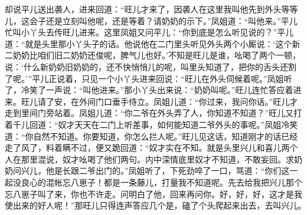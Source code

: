 \documentclass[12pt,oneside]{book}
\begin{document}
却说平儿送出袭人，进来回道：“旺儿才来了，因袭人在这里我叫他先到外头等等儿，这会子还是立刻叫他呢，还是等着？请奶奶的示下。”凤姐道：“叫他来。”平儿忙叫小丫头去传旺儿进来。这里凤姐又问平儿：“你到底是怎么听见说的？”平儿道：“就是头里那小丫头子的话。他说他在二门里头听见外头两个小厮说：‘这个新二奶奶比咱们旧二奶奶还俊呢，脾气儿也好。’不知是旺儿是谁，吆喝了两个一顿，说：‘什么新奶奶旧奶奶的，还不快悄悄儿的呢，叫里头知道了，把你的舌头还割了呢。’”平儿正说着，只见一个小丫头进来回说：“旺儿在外头伺候着呢。”凤姐听了，冷笑了一声说：“叫他进来。”那小丫头出来说：“奶奶叫呢。”旺儿连忙答应着进来。旺儿请了安，在外间门口垂手侍立。凤姐儿道：“你过来，我问你话。”旺儿才走到里间门旁站着。凤姐儿道：“你二爷在外头弄了人，你知道不知道？”旺儿又打着千儿回道：“奴才天天在二门上听差事，如何能知道二爷外头的事呢。”凤姐冷笑道：“你自然不知道。你要知道，你怎么拦人呢。”旺儿见这话，知道刚才的话已经走了风了，料着瞒不过，便又跪回道：“奴才实在不知。就是头里兴儿和喜儿两个人在那里混说，奴才吆喝了他们两句。内中深情底里奴才不知道，不敢妄回。求奶奶问兴儿，他是长跟二爷出门的。”凤姐听了，下死劲啐了一口，骂道：“你们这一起没良心的混帐忘八崽子！都是一条藤儿，打量我不知道呢。先去给我把兴儿那个忘八崽子叫了来，你也不许走。问明白了他，回来再问你。好，好，好，这才是我使出来的好人呢！”那旺儿只得连声答应几个是，磕了个头爬起来出去，去叫兴儿。　　
\end{document}
